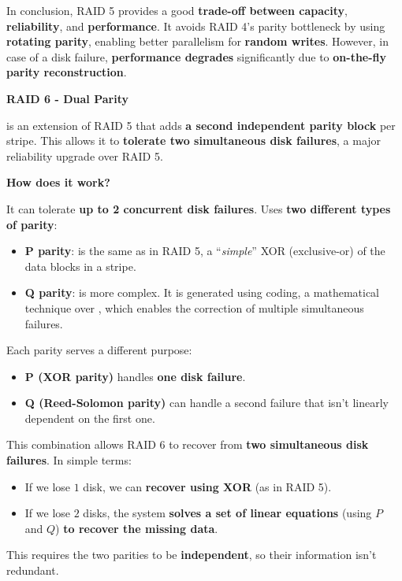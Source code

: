 \highspace
In conclusion, RAID 5 provides a good \textbf{trade-off between capacity}, \textbf{reliability}, and \textbf{performance}. It avoids RAID 4's parity bottleneck by using \textbf{rotating parity}, enabling better parallelism for \textbf{random writes}. However, in case of a disk failure, \textbf{performance degrades} significantly due to \textbf{on-the-fly parity reconstruction}.

\newpage

\begin{center}\label{RAID 6}
    \large
    \hypertarget{RAID 6}{\textcolor{Red2}{\textbf{RAID 6 - Dual Parity}}}
\end{center}
 is an extension of RAID 5 that adds \textbf{a second independent parity block} per stripe. This allows it to \textbf{tolerate two simultaneous disk failures}, a major reliability upgrade over RAID 5.

\highspace
\begin{flushleft}
    \textcolor{Green3}{ \textbf{How does it work?}}
\end{flushleft}
It can tolerate \textbf{up to 2 concurrent disk failures}. Uses \textbf{two different types of parity}:
\begin{itemize}
    \item \textbf{P parity}: is the same as in RAID 5, a ``\emph{simple}'' XOR (exclusive-or) of the data blocks in a stripe.
    \item \textbf{Q parity}: is more complex. It is generated using  coding, a mathematical technique over , which enables the correction of multiple simultaneous failures.
\end{itemize}
Each parity serves a different purpose:
\begin{itemize}
    \item \textbf{P (XOR parity)} handles \textbf{one disk failure}.
    \item \textbf{Q (Reed-Solomon parity)} can handle a second failure that isn't linearly dependent on the first one.
\end{itemize}
This combination allows RAID 6 to recover from \textbf{two simultaneous disk failures}. In simple terms:
\begin{itemize}
    \item If we lose $1$ disk, we can \textbf{recover using XOR} (as in RAID 5).
    \item If we lose $2$ disks, the system \textbf{solves a set of linear equations} (using $P$ and $Q$) \textbf{to recover the missing data}.
\end{itemize}
This requires the two parities to be \textbf{independent}, so their information isn't redundant.

